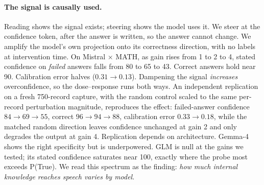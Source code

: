 \documentclass{article}
\begin{document}
\paragraph{The signal is causally used.}
Reading shows the signal exists; steering shows the model uses it.
We steer at the confidence token, after the answer is written, so the answer cannot change.
We amplify the model's own projection onto its correctness direction, with no labels at intervention time.
On Mistral $\times$ MATH, as gain rises from 1 to 2 to 4, stated confidence on \emph{failed} answers falls from 80 to 65 to 43.
Correct answers hold near 90.
Calibration error halves ($0.31 \to 0.13$).
Dampening the signal \emph{increases} overconfidence, so the dose--response runs both ways.
An independent replication on a fresh 750-record capture, with the random control scaled to the same per-record perturbation magnitude, reproduces the effect: failed-answer confidence $84 \to 69 \to 55$, correct $96 \to 94 \to 88$, calibration error $0.33 \to 0.18$, while the matched random direction leaves confidence unchanged at gain 2 and only degrades the output at gain 4.
Replication depends on architecture.
Gemma-4 shows the right specificity but is underpowered.
GLM is null at the gains we tested; its stated confidence saturates near 100, exactly where the probe most exceeds P(True).
We read this spectrum as the finding: \emph{how much internal knowledge reaches speech varies by model}.
\end{document}
